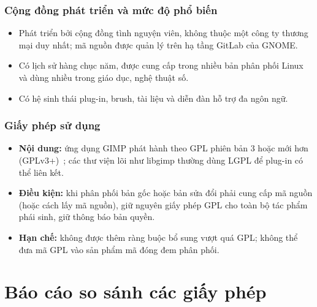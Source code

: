 \documentclass[12pt,a4paper]{article}
\begin{document}
\subsubsection*{Cộng đồng phát triển và mức độ phổ biến}
\begin{itemize}
  \item Phát triển bởi cộng đồng tình nguyện viên, không thuộc một công ty thương mại duy nhất; mã nguồn được quản lý trên hạ tầng GitLab của GNOME.
  \item Có lịch sử hàng chục năm, được cung cấp trong nhiều bản phân phối Linux và dùng nhiều trong giáo dục, nghệ thuật số.
  \item Có hệ sinh thái plug-in, brush, tài liệu và diễn đàn hỗ trợ đa ngôn ngữ.
\end{itemize}
\subsubsection*{Giấy phép sử dụng}
\begin{itemize}
  \item \textbf{Nội dung:} ứng dụng GIMP phát hành theo GPL phiên bản 3 hoặc mới hơn (GPLv3+)~\cite{gpl}; các thư viện lõi như libgimp thường dùng LGPL để plug-in có thể liên kết.
  \item \textbf{Điều kiện:} khi phân phối bản gốc hoặc bản sửa đổi phải cung cấp mã nguồn (hoặc cách lấy mã nguồn), giữ nguyên giấy phép GPL cho toàn bộ tác phẩm phái sinh, giữ thông báo bản quyền.
  \item \textbf{Hạn chế:} không được thêm ràng buộc bổ sung vượt quá GPL; không thể đưa mã GPL vào sản phẩm mã đóng đem phân phối.
\end{itemize}

\section{Báo cáo so sánh các giấy phép}\label{sec:compare}
\end{document}
